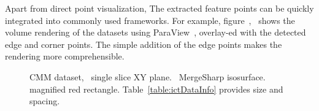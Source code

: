 %
Apart from direct point visualization,  The extracted feature points can be quickly integrated into commonly used frameworks. For example, figure~,~ shows the volume rendering of the datasets using ParaView~\cite{Ayachit2015}, overlay-ed  with the detected edge and corner points. The simple addition of the edge points makes the rendering more comprehensible.
\begin{figure}
    \centering
    \caption{CMM dataset,~\protect{} single slice XY plane.~\protect{} MergeSharp isosurface.~\protect{}  magnified red rectangle. Table~\ref{table:ictDataInfo} provides size and spacing.}
\end{figure}
